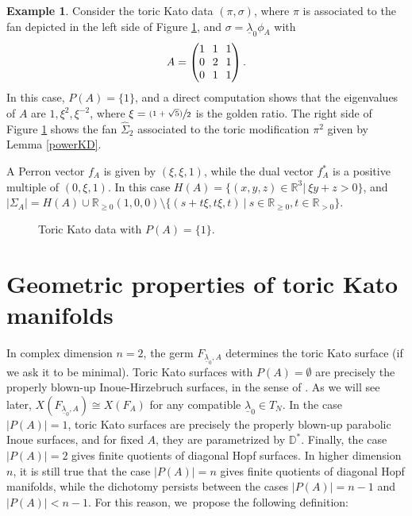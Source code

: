 \documentclass[JEP,XML,SOM,Unicode,NoFloatCountersInSection]{cedram}
\theoremstyle{definition}
\newtheorem{example}[theorem]{Example}
\newcommand{\psfrac}[2]{\sfrac{(#1)}{#2}}
\let\la\lambda
\let\sminus\setminus
\let\un\underline
\newcommand{\DD}{\mathbb{D}}
\newcommand{\RR}{\mathbb{R}}
\newcommand{\abs}[1]{\vert #1\vert}
\begin{document}
\begin{example}
Consider the toric Kato data $(\pi, \sigma)$, where $\pi$ is associated to the fan depicted in the left side of Figure \ref{fig:example1}, and $\sigma = \un\la_0 \phi_A$ with
\[\arraycolsep3.5pt
A=\begin{pmatrix}
1 & 1 & 1 \\
0 & 2 & 1 \\
0 & 1 & 1
\end{pmatrix}.
\]
In this case, $P(A)=\{1\}$, and a direct computation shows that the eigenvalues of $A$ are $1, \xi^2, \xi^{-2}$, where $\xi=\psfrac{1+\sqrt{5}}{2}$ is the golden ratio.
The right side of Figure \ref{fig:example1} shows the fan $\hat{\Sigma}_2$ associated to the toric modification $\pi^2$ given by Lemma \ref{powerKD}.

A Perron vector $f_A$ is given by $(\xi, \xi, 1)$, while the dual vector $f_A^*$ is a positive multiple of $(0, \xi, 1)$.
In this case $H(A)=\{(x,y,z) \in \RR^3 |\ \xi y + z > 0 \}$, and $\abs{\Sigma_A}=H(A) \cup \RR_{\geq 0} (1,0,0) \sminus \{(s+t\xi,t\xi,t)\ |\ s \in \RR_{\geq 0}, t \in \RR_{>0}\}$.

\begin{tiny}
\begin{figure}[h]
\centering
\begin{minipage}[htbp]{\columnwidth}
\def\svgwidth{0.48\columnwidth}

\hfill
\def\svgwidth{0.48\columnwidth}

\end{minipage}
\caption{Toric Kato data with $P(A)=\{1\}$.}
\label{fig:example1}
\end{figure}
\end{tiny}
\end{example}

\section{Geometric properties of toric Kato manifolds}\label{geomprop}

In complex dimension $n=2$, the germ $F_{\un\la_0,A}$ determines the toric Kato surface (if we ask it to be minimal). Toric Kato surfaces with $P(A)=\emptyset$ are precisely the properly blown-up Inoue-Hirzebruch surfaces, in the sense of \cite{fp}. As we will see later, $X(F_{\un\la_0,A})\cong X(F_A)$ for any compatible $\un\la_0\in T_N$. In the case $|P(A)|=1$, toric Kato surfaces are precisely the properly blown-up parabolic Inoue surfaces, and for fixed $A$, they are parametrized by $\DD^*$. Finally, the case $|P(A)|=2$ gives finite quotients of diagonal Hopf surfaces. In higher dimension $n$, it is still true that the case $|P(A)|=n$ gives finite quotients of diagonal Hopf manifolds, while the dichotomy persists between the cases $|P(A)|=n-1$ and $|P(A)|<n-1$. For this reason, we~propose the following definition:
\end{document}
